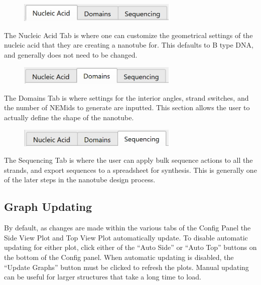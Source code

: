 \documentclass[titlepage]{article}
\begin{document}
	\begin{figure}[h]
		\centering
		\includegraphics[width=3in]{"nucleic-acid-tab-activated.png"}
		\label{fig:nucleic-acid-tab-activated}
	\end{figure}

	The Nucleic Acid Tab is where one can customize the geometrical settings of the nucleic acid that they are creating a nanotube for. This defaults to B type DNA, and generally does not need to be changed. 

	\begin{figure}[h]
		\centering
		\includegraphics[width=3in]{"domains-tab-activated.png"}
		\label{fig:domains-tab-activated}
	\end{figure}

	The Domains Tab is where settings for the interior angles, strand switches, and the number of NEMids to generate are inputted. This section allows the user to actually define the shape of the nanotube.

	\begin{figure}[h]
		\centering
		\includegraphics[width=3in]{"sequencing-tab-activated.png"}
		\label{fig:sequencing-activated}
	\end{figure}

	The Sequencing Tab is where the user can apply bulk sequence actions to all the strands, and export sequences to a spreadsheet for synthesis. This is generally one of the later steps in the nanotube design process.
	
	\subsection{Graph Updating}
	
	By default, as changes are made within the various tabs of the Config Panel the Side View Plot and Top View Plot automatically update. To disable automatic updating for either plot, click either of the “Auto Side” or “Auto Top” buttons on the bottom of the Config panel. When automatic updating is disabled, the “Update Graphs” button must be clicked to refresh the plots. Manual updating can be useful for larger structures that take a long time to load.
	
\end{document}
